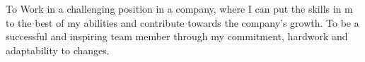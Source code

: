 

\begin{cvparagraph}

To Work in a challenging position in a company, where I can put the skills in m to the best of my abilities and contribute towards the company's growth. To be a successful and inspiring team member through my commitment, hardwork and adaptability to changes.
\end{cvparagraph}
